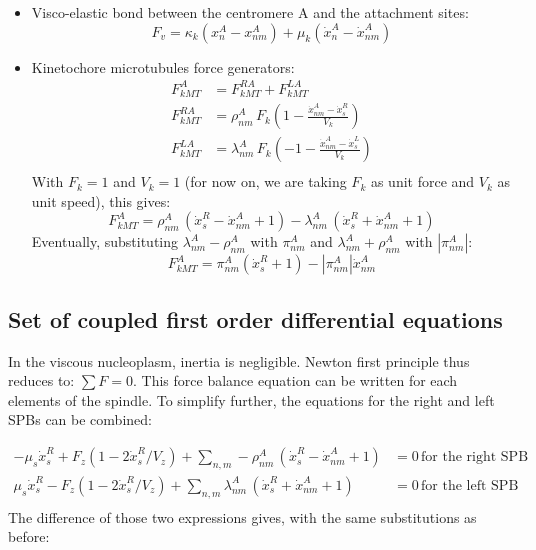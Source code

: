 \documentclass[a4paper,12pt]{article}
\begin{document}
\begin{itemize}
\item Visco-elastic bond between the centromere A and the
  attachment sites:
  $$F_v =  \kappa_k(x_n^A - x_{nm}^A) 
  + \mu_k(\dot{x}_n^A - \dot{x}_{nm}^A) $$
\item Kinetochore microtubules force generators:
  \begin{equation}
    \begin{aligned}
      F_{kMT}^A &= F_{kMT}^{RA} + F_{kMT}^{LA}\\
      F_{kMT}^{RA} &= \rho_{nm}^A\,F_k\left(1 - \frac{\dot{x}^A_{nm} -
          \dot{x}^R_s}{V_k}\right)\\
      F_{kMT}^{LA} &=  \lambda_{nm}^A\,F_k\left(-1 - \frac{\dot{x}^A_{nm} -
          \dot{x}^L_s}{V_k}\right)\\
    \end{aligned}
  \end{equation}
With $F_k = 1$ and $ V_k = 1$ (for now on, we are taking $F_k$ as
unit force and $V_k$ as unit speed), this gives:
\begin{equation}
 F_{kMT}^A = \rho_{nm}^A\,\left(\dot{x}^R_s - \dot{x}^A_{nm} + 1\right)%
 - \lambda_{nm}^A\,\left(\dot{x}^R_s + \dot{x}^A_{nm} + 1\right)
\end{equation}
Eventually, substituting $\lambda^A_{nm} - \rho^A_{nm}$ with $\pi_{nm}^A$ and $\lambda^A_{nm} + \rho^A_{nm}$ with $|\pi_{nm}^A|$:
\begin{equation}
    F_{kMT}^A =  \pi_{nm}^A(\dot{x}^R_s + 1) - |\pi_{nm}^A|\dot{x}^A_{nm}
\end{equation}
\end{itemize}

\subsection{Set of coupled first order differential equations}

In the viscous nucleoplasm, inertia is negligible. Newton first
principle thus reduces to: $ \sum F = 0 $. This force balance equation
can be written for each elements of the spindle. 
To simplify further, the equations for the right and left SPBs can be
combined:
 
\begin{equation}
  \begin{aligned}
    - \mu_s\dot{x}^R_s + F_{z}\left(1 - 2\dot{x}^R_s/V_z\right)%
    + \sum_{n,m} - \rho_{nm}^A\,\left(\dot{x}^R_s - \dot{x}^A_{nm} +%
      1\right) &= 0 \, \mbox{for the right SPB}\\
    \mu_s\dot{x}^R_s - F_{z}\left(1 - 2\dot{x}^R_s/V_z\right)%
    + \sum_{n,m} \lambda_{nm}^A\,\left(\dot{x}^R_s + \dot{x}^A_{nm} +%
      1\right) &= 0 \, \mbox{for the left SPB}\\
  \end{aligned}
\end{equation}
The difference of those two expressions gives, with the same substitutions as before:
\end{document}
